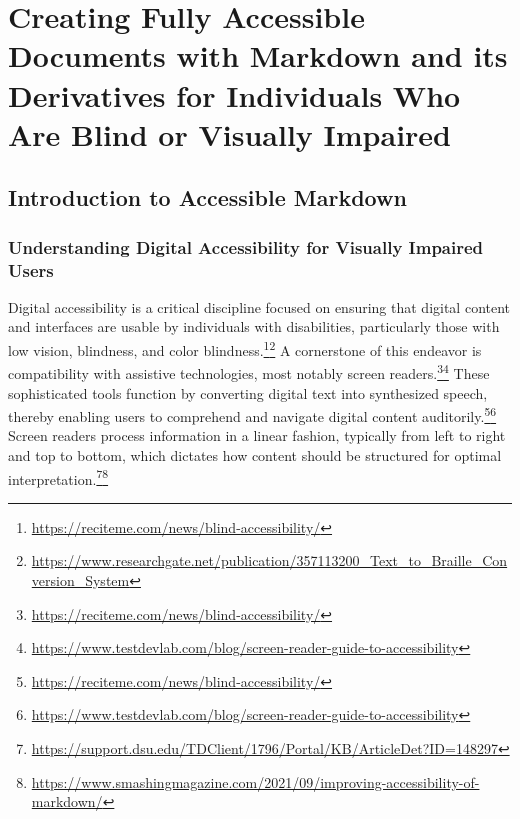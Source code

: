 \chapter{Creating Fully Accessible Documents with Markdown and its Derivatives for Individuals Who Are Blind or Visually Impaired}

\section{Introduction to Accessible Markdown}

\subsection{Understanding Digital Accessibility for Visually Impaired Users}
Digital accessibility is a critical discipline focused on ensuring that digital content and interfaces are usable by individuals with disabilities, particularly those with low vision, blindness, and color blindness.\footnote{\url{https://reciteme.com/news/blind-accessibility/}}\footnote{\url{https://www.researchgate.net/publication/357113200_Text_to_Braille_Conversion_System}} A cornerstone of this endeavor is compatibility with assistive technologies, most notably screen readers.\footnote{\url{https://reciteme.com/news/blind-accessibility/}}\footnote{\url{https://www.testdevlab.com/blog/screen-reader-guide-to-accessibility}} These sophisticated tools function by converting digital text into synthesized speech, thereby enabling users to comprehend and navigate digital content auditorily.\footnote{\url{https://reciteme.com/news/blind-accessibility/}}\footnote{\url{https://www.testdevlab.com/blog/screen-reader-guide-to-accessibility}} Screen readers process information in a linear fashion, typically from left to right and top to bottom, which dictates how content should be structured for optimal interpretation.\footnote{\url{https://support.dsu.edu/TDClient/1796/Portal/KB/ArticleDet?ID=148297}}\footnote{\url{https://www.smashingmagazine.com/2021/09/improving-accessibility-of-markdown/}}

